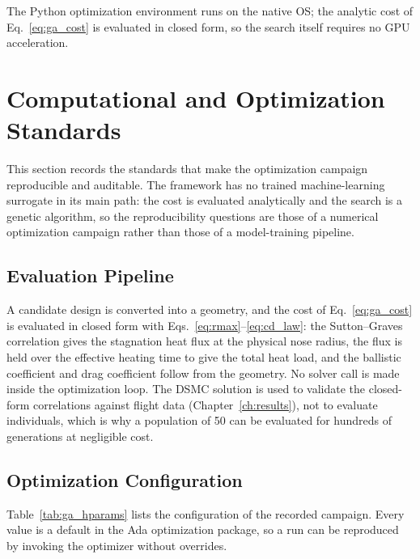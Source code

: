 The Python optimization environment runs on the native OS; the analytic cost of Eq.~\eqref{eq:ga_cost} is evaluated in closed form, so the search itself requires no GPU acceleration.

\section{Computational and Optimization Standards}
\label{sec:comp_standards}

This section records the standards that make the optimization campaign reproducible and auditable. The framework has no trained machine-learning surrogate in its main path: the cost is evaluated analytically and the search is a genetic algorithm, so the reproducibility questions are those of a numerical optimization campaign rather than those of a model-training pipeline.

\subsection{Evaluation Pipeline}
A candidate design is converted into a geometry, and the cost of Eq.~\eqref{eq:ga_cost} is evaluated in closed form with Eqs.~\eqref{eq:rmax}--\eqref{eq:cd_law}: the Sutton--Graves correlation gives the stagnation heat flux at the physical nose radius, the flux is held over the effective heating time to give the total heat load, and the ballistic coefficient and drag coefficient follow from the geometry. No solver call is made inside the optimization loop. The DSMC solution is used to validate the closed-form correlations against flight data (Chapter~\ref{ch:results}), not to evaluate individuals, which is why a population of 50 can be evaluated for hundreds of generations at negligible cost.

\subsection{Optimization Configuration}
Table~\ref{tab:ga_hparams} lists the configuration of the recorded campaign. Every value is a default in the Ada optimization package, so a run can be reproduced by invoking the optimizer without overrides.

